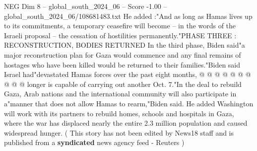 \begin{textsample}{NEG Dim 8 – global\_south\_2024\_06 – Score -1.00 – global\_south\_2024\_06/108681483.txt}
He added :"And as long as Hamas lives up to its commitments, a temporary ceasefire will become -- in the words of the Israeli proposal -- the cessation of hostilities permanently."PHASE THREE : RECONSTRUCTION, BODIES RETURNED In the third phase, Biden said"a major reconstruction plan for Gaza would commence and any final remains of hostages who have been killed would be returned to their families."Biden said Israel had"devastated Hamas forces over the past eight months, @ @ @ @ @ @ @ @ @ @ longer is capable of carrying out another Oct. 7."In the deal to rebuild Gaza, Arab nations and the international community will also participate in a"manner that does not allow Hamas to rearm,"Biden said.
He added Washington will work with its partners to rebuild homes, schools and hospitals in Gaza, where the war has displaced nearly the entire 2.3 million population and caused widespread hunger. ( This story has not been edited by News18 staff and is published from a \textbf{syndicated} news agency feed - Reuters )

\end{textsample}
